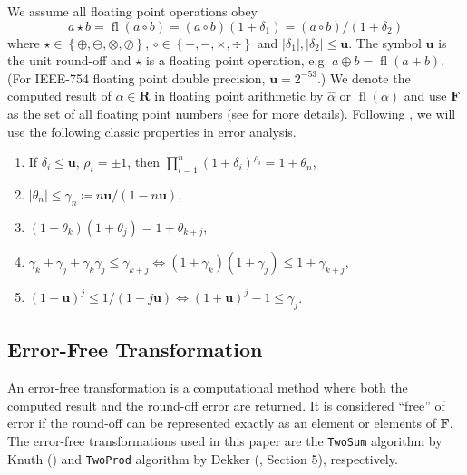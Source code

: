 \documentclass[3p, authoryear, square]{elsarticle}
\theoremstyle{definition}
\newcommand{\fl}[1]{\operatorname{fl}\left(#1\right)}
\newcommand{\mach}{\mathbf{u}}
\begin{document}
We assume all floating point operations obey
\begin{equation}
  a \star b = \fl{a \circ b} = (a \circ b)(1 + \delta_1) =
  (a \circ b) / (1 + \delta_2)
\end{equation}
where \(\star \in \left\{\oplus, \ominus, \otimes, \oslash\right\}\), \(\circ
\in \left\{+, -, \times, \div\right\}\) and \(\left|\delta_1\right|,
\left|\delta_2\right| \leq \mach\). The symbol \(\mach\) is the unit round-off
and \(\star\) is a floating point operation, e.g.
\(a \oplus b = \fl{a + b}\). (For IEEE-754 floating point double precision,
\(\mach = 2^{-53}\).) We denote the computed result of
\(\alpha \in \mathbf{R}\) in floating point arithmetic by
\(\widehat{\alpha}\) or \(\fl{\alpha}\) and use \(\mathbf{F}\) as the set of
all floating point numbers (see \cite{Higham2002} for more details).
Following \cite{Higham2002}, we will use the following classic properties in
error analysis.

\begin{enumerate}
  \item If \(\delta_i \leq \mach\), \(\rho_i = \pm 1\), then
      \(\prod_{i = 1}^n (1 + \delta_i)^{\rho_i} = 1 + \theta_n\),
  \item \(\left|\theta_n\right| \leq \gamma_n \coloneqq
      n \mach / (1 - n \mach)\),
  \item \((1 + \theta_k)(1 + \theta_j) = 1 + \theta_{k + j}\),
  \item \(\gamma_k + \gamma_j + \gamma_k \gamma_j \leq \gamma_{k + j}
    \Longleftrightarrow (1 + \gamma_k)(1 + \gamma_j) \leq 1 + \gamma_{k + j}\),
  \item \((1 + \mach)^j \leq 1 / (1 - j \mach) \Longleftrightarrow
  (1 + \mach)^j - 1 \leq \gamma_j\).
\end{enumerate}

\subsection{Error-Free Transformation}

An error-free transformation is a computational method where both
the computed result and the round-off error are returned. It
is considered ``free'' of error if the round-off can be represented
exactly as an element or elements of \(\mathbf{F}\).
The error-free transformations used in this paper are
the \texttt{TwoSum} algorithm by Knuth (\cite{Knuth1997}) and
\texttt{TwoProd} algorithm by Dekker (\cite{Dekker1971}, Section 5),
respectively.
\end{document}
